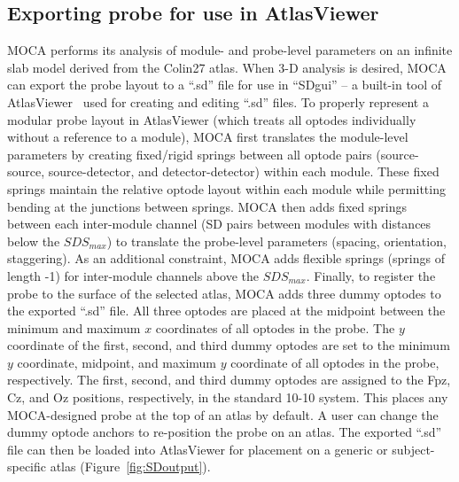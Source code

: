 \subsection{Exporting probe for use in AtlasViewer}
\ac{MOCA} performs its analysis of module- and probe-level parameters on an infinite slab model derived from the Colin27 atlas. When 3-D analysis is desired, \ac{MOCA} can export the probe layout to a ``.sd'' file for use in ``SDgui'' -- a built-in tool of AtlasViewer~\cite{Aasted2015} used for creating and editing ``.sd'' files. To properly represent a modular probe layout in AtlasViewer (which treats all optodes individually without a reference to a module), \ac{MOCA} first translates the module-level parameters by creating fixed/rigid springs between all optode pairs (source-source, source-detector, and detector-detector) within each module. These fixed springs maintain the relative optode layout within each module while permitting bending at the junctions between springs. \ac{MOCA} then adds fixed springs between each inter-module channel (\ac{SD} pairs between modules with distances below the $SDS_{max}$) to translate the probe-level parameters (spacing, orientation, staggering). As an additional constraint, \ac{MOCA} adds flexible springs (springs of length -1) for inter-module channels above the $SDS_{max}$. Finally, to register the probe to the surface of the selected atlas, \ac{MOCA} adds three dummy optodes to the exported ``.sd'' file. All three optodes are placed at the midpoint between the minimum and maximum $x$ coordinates of all optodes in the probe. The $y$ coordinate of the first, second, and third dummy optodes are set to the minimum $y$ coordinate, midpoint, and maximum $y$ coordinate of all optodes in the probe, respectively. The first, second, and third dummy optodes are assigned to the Fpz, Cz, and Oz positions, respectively, in the standard 10-10 system. This places any \ac{MOCA}-designed probe at the top of an atlas by default. A user can change the dummy optode anchors to re-position the probe on an atlas. The exported ``.sd'' file can then be loaded into AtlasViewer for placement on a generic or subject-specific atlas (Figure~\ref{fig:SDoutput}).


